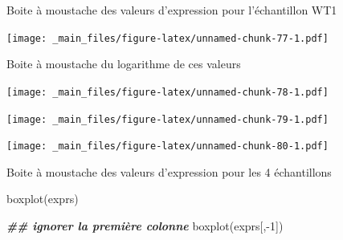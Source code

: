 \documentclass[
]{book}
\newenvironment{Shaded}{\begin{snugshade}}{\end{snugshade}}
\newcommand{\DecValTok}[1]{\textcolor[rgb]{0.00,0.00,0.81}{#1}}
\newcommand{\DocumentationTok}[1]{\textcolor[rgb]{0.56,0.35,0.01}{\textbf{\textit{#1}}}}
\newcommand{\FunctionTok}[1]{\textcolor[rgb]{0.00,0.00,0.00}{#1}}
\newcommand{\NormalTok}[1]{#1}
\newcommand{\SpecialCharTok}[1]{\textcolor[rgb]{0.00,0.00,0.00}{#1}}
\begin{document}
Boite à moustache des valeurs d'expression pour l'échantillon WT1

\begin{Shaded}
\end{Shaded}

\texttt{[image: \_main\_files/figure-latex/unnamed-chunk-77-1.pdf]}

Boite à moustache du logarithme de ces valeurs

\begin{Shaded}
\end{Shaded}

\texttt{[image: \_main\_files/figure-latex/unnamed-chunk-78-1.pdf]}

\begin{Shaded}
\end{Shaded}

\texttt{[image: \_main\_files/figure-latex/unnamed-chunk-79-1.pdf]}

\begin{Shaded}
\end{Shaded}

\texttt{[image: \_main\_files/figure-latex/unnamed-chunk-80-1.pdf]}

Boite à moustache des valeurs d'expression pour les 4 échantillons

\begin{Shaded}
\begin{Highlighting}[]
\FunctionTok{boxplot}\NormalTok{(exprs)}
\end{Highlighting}
\end{Shaded}

\begin{Shaded}
\begin{Highlighting}[]
\DocumentationTok{\#\# ignorer la première colonne}
\FunctionTok{boxplot}\NormalTok{(exprs[,}\SpecialCharTok{{-}}\DecValTok{1}\NormalTok{])     }
\end{Highlighting}
\end{Shaded}
\end{document}
